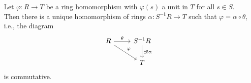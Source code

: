 Let $\varphi\colon R\to T$ be a ring homomorphism with $\varphi(s)$ a unit in $T$
for all $s \in S$. Then there is a unique homomorphism of rings
$\alpha\colon S^{-1}R\to T$ such that $\varphi = \alpha\circ\theta$, i.e., the
diagram
\[\begin{tikzcd}
	R\ar[r, "\theta"]\ar[dr, "\varphi"] & S^{-1}R\ar[d, densely dotted, "\exists! \alpha"]\\
	& T
\end{tikzcd}\]
is commutative.
